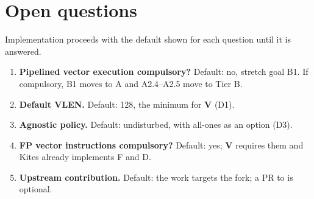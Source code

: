 \documentclass[11pt]{article}
\begin{document}
\section{Open questions}\label{sec:open}

Implementation proceeds with the default shown for each question until it is answered.

\begin{enumerate}[label=Q\arabic*,leftmargin=1cm]
\item \textbf{Pipelined vector execution compulsory?} Default: no, stretch goal B1. If compulsory,
      B1 moves to A and A2.4--A2.5 move to Tier B.
\item \textbf{Default VLEN.} Default: 128, the minimum for \textbf{V} (D1).
\item \textbf{Agnostic policy.} Default: undisturbed, with all-ones as an option (D3).
\item \textbf{FP vector instructions compulsory?} Default: yes; \textbf{V} requires them and Kites
      already implements F and D.
\item \textbf{Upstream contribution.} Default: the work targets the fork; a PR to
       is optional.
\end{enumerate}
\end{document}
